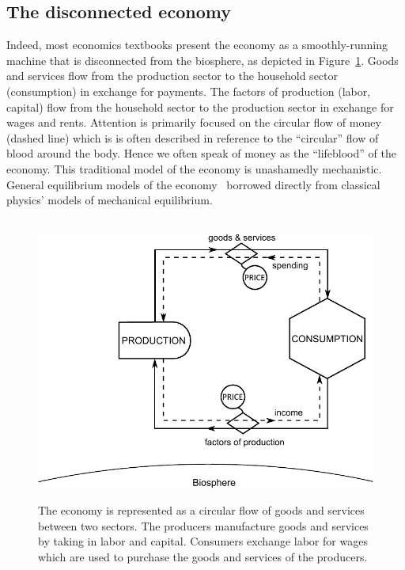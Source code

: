 \subsection{The disconnected economy}

Indeed, most economics textbooks present the economy as a smoothly-running machine
that is disconnected from the biosphere,
as depicted in Figure~\ref{fig:perp_motion_1}.
Goods and services flow from the production sector
to the household sector (consumption)
in exchange for payments.
The factors of production (labor, capital)
flow from the household sector to the
production sector in exchange for wages and rents.
Attention is primarily focused on the circular flow
of money (dashed line) which is
is often described in reference to 
the ``circular'' flow of blood around the body.
Hence we often speak of money as the
``lifeblood'' of the economy.
This traditional model of the economy is unashamedly mechanistic.
General equilibrium models of the economy~\cite{Walras1892, Walras1993}
borrowed directly from classical physics' models of 
mechanical equilibrium.\cite{Ingrao1990}

\begin{figure}[!ht]
\centering\
\includegraphics[width=\linewidth]{Part_0/Chapter_Introduction/images/Perpetual_motion_1.pdf}
\caption[The traditional economic model of the economy]{The economy 
is represented as a circular flow of goods and services between two sectors. 
The producers manufacture goods and services 
by taking in labor and capital. 
Consumers exchange labor for wages 
which are used to purchase 
the goods and services of the producers.}
\label{fig:perp_motion_1}
\end{figure}


